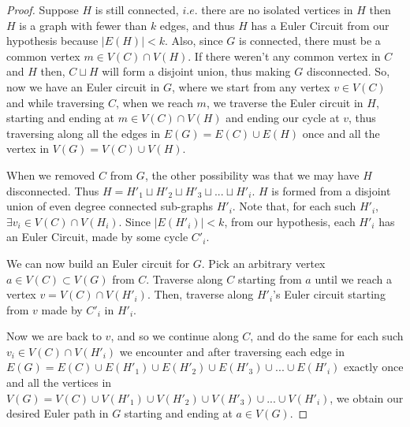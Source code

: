 \documentclass[17pt]{article}
\begin{document}
\begin{proof}
 	  Suppose $H$ is still connected, $i.e.$ there are no isolated vertices in $H$ then $H$ is a graph with fewer than $k$ edges, and thus $H$ has a Euler Circuit from our hypothesis because $\vert E(H) \vert < k$. Also, since $G$ is connected, there must be a common vertex $m \in V(C) \cap V(H)$. If there weren't any common vertex in $C$ and $H$ then, $C \sqcup H$ will form a disjoint union, thus making $G$ disconnected. So, now we have an Euler circuit in $G$, where we start from any vertex $v \in V(C)$ and while traversing $C$, when we reach $m$, we traverse the Euler circuit in $H$, starting and ending at $m \in V(C) \cap V(H)$ and ending our cycle at $v$, thus traversing along all the edges in $E(G) = E(C) \cup E(H)$ once and all the vertex in $V(G) = V(C) \cup V(H)$.
 	 
 	   When we removed $C$ from $G$, the other possibility was that we may have $H$ disconnected. Thus $H = H'_1 \sqcup H'_2 \sqcup H'_3 \sqcup ... \sqcup H'_i$. $H$ is formed from a disjoint union of even degree connected sub-graphs $H'_i$. Note that, for each such $H'_i$, $\exists v_i \in V(C) \cap V(H_i)$. Since $\vert E(H'_i) \vert < k$, from our hypothesis, each $H'_i$ has an Euler Circuit, made by some cycle $C'_i$.
 	   
 	   We can now build an Euler circuit for $G$. Pick an arbitrary vertex $a \in V(C) \subset V(G)$ from $C$. Traverse along $C$ starting from $a$ until we reach a vertex $v = V(C) \cap V(H'_i)$. Then, traverse along $H'_i$'s Euler circuit starting from $v$ made by  $C'_i$ in $H'_i$. 
 	   
 	   Now we are back to $v$, and so we continue along $C$, and do the same for each such $v_i \in V(C) \cap V(H'_i)$ we encounter and after traversing each edge in $E(G) = E(C) \cup E(H'_1)\cup E(H'_2) \cup E(H'_3)\cup... \cup E(H'_i)$ exactly once and all the vertices in $V(G) = V(C) \cup V(H'_1)\cup V(H'_2) \cup V(H'_3) \cup... \cup V(H'_i)$, we obtain our desired Euler path in $G$ starting and ending at $a \in V(G)$. 	  
\end{proof} 

\end{document}
